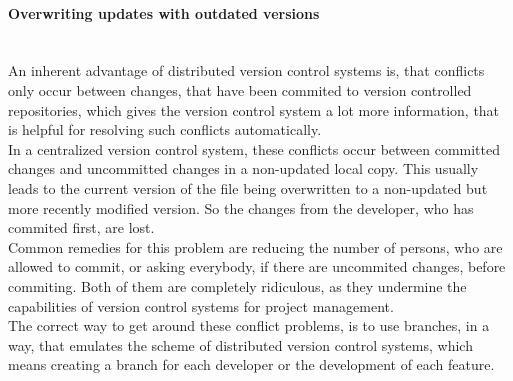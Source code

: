 			\paragraph{Overwriting updates with outdated versions}~\\
				An inherent advantage of distributed version control systems is, that conflicts only occur between changes, that have been commited to version controlled repositories, which gives the version control system a lot more information, that is helpful for resolving such conflicts automatically.\\
				In a centralized version control system, these conflicts occur between committed changes and uncommitted changes in a non-updated local copy.
				This usually leads to the current version of the file being overwritten to a non-updated but more recently modified version.
				So the changes from the developer, who has commited first, are lost.\\
				Common remedies for this problem are reducing the number of persons, who are allowed to commit, or asking everybody, if there are uncommited changes, before commiting.
				Both of them are completely ridiculous, as they undermine the capabilities of version control systems for project management.\\
				The correct way to get around these conflict problems, is to use branches, in a way, that emulates the scheme of distributed version control systems, which means creating a branch for each developer or the development of each feature.


